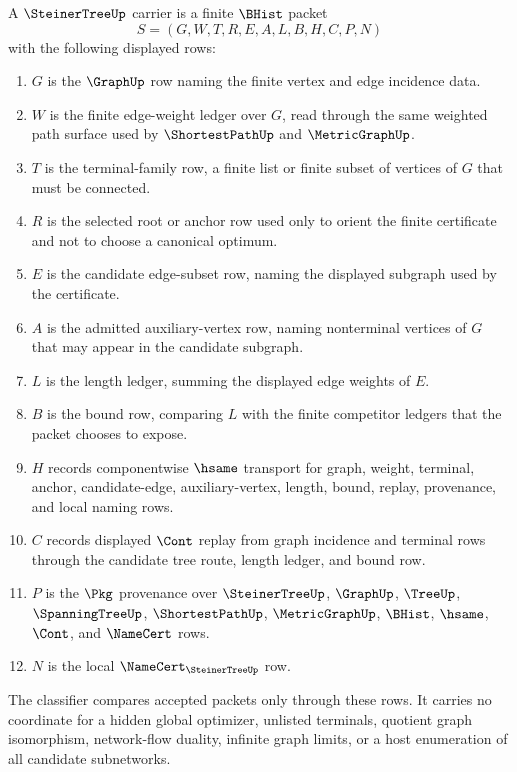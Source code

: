 \begin{definition}
\label{def:steiner-tree-carrier}
A $\SteinerTreeUp$ carrier is a finite $\BHist$ packet
$$
S=(G,W,T,R,E,A,L,B,H,C,P,N)
$$
with the following displayed rows:
\begin{enumerate}
\item $G$ is the $\GraphUp$ row naming the finite vertex and edge incidence
data.
\item $W$ is the finite edge-weight ledger over $G$, read through the same
weighted path surface used by $\ShortestPathUp$ and $\MetricGraphUp$.
\item $T$ is the terminal-family row, a finite list or finite subset of
vertices of $G$ that must be connected.
\item $R$ is the selected root or anchor row used only to orient the finite
certificate and not to choose a canonical optimum.
\item $E$ is the candidate edge-subset row, naming the displayed subgraph used
by the certificate.
\item $A$ is the admitted auxiliary-vertex row, naming nonterminal vertices of
$G$ that may appear in the candidate subgraph.
\item $L$ is the length ledger, summing the displayed edge weights of $E$.
\item $B$ is the bound row, comparing $L$ with the finite competitor ledgers
that the packet chooses to expose.
\item $H$ records componentwise $\hsame$ transport for graph, weight,
terminal, anchor, candidate-edge, auxiliary-vertex, length, bound, replay,
provenance, and local naming rows.
\item $C$ records displayed $\Cont$ replay from graph incidence and terminal
rows through the candidate tree route, length ledger, and bound row.
\item $P$ is the $\Pkg$ provenance over $\SteinerTreeUp$, $\GraphUp$,
$\TreeUp$, $\SpanningTreeUp$, $\ShortestPathUp$, $\MetricGraphUp$, $\BHist$,
$\hsame$, $\Cont$, and $\NameCert$ rows.
\item $N$ is the local $\NameCert_{\SteinerTreeUp}$ row.
\end{enumerate}
The classifier compares accepted packets only through these rows. It carries
no coordinate for a hidden global optimizer, unlisted terminals, quotient graph
isomorphism, network-flow duality, infinite graph limits, or a host
enumeration of all candidate subnetworks.
\end{definition}


